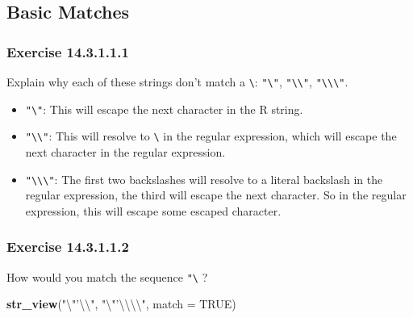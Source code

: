 \documentclass[]{book}
\newenvironment{Shaded}{\begin{snugshade}}{\end{snugshade}}
\newcommand{\CharTok}[1]{\textcolor[rgb]{0.31,0.60,0.02}{#1}}
\newcommand{\DataTypeTok}[1]{\textcolor[rgb]{0.13,0.29,0.53}{#1}}
\newcommand{\KeywordTok}[1]{\textcolor[rgb]{0.13,0.29,0.53}{\textbf{#1}}}
\newcommand{\NormalTok}[1]{#1}
\newcommand{\OtherTok}[1]{\textcolor[rgb]{0.56,0.35,0.01}{#1}}
\newcommand{\StringTok}[1]{\textcolor[rgb]{0.31,0.60,0.02}{#1}}
\providecommand{\tightlist}{%
  \setlength{\itemsep}{0pt}\setlength{\parskip}{0pt}}
\theoremstyle{plain}
\theoremstyle{remark}
\begin{document}
\hypertarget{basic-matches}{%
\subsection{Basic Matches}\label{basic-matches}}

\hypertarget{exercise-14.3.1.1.1}{%
\subsubsection*{\texorpdfstring{Exercise
{14.3.1.1.1}}{Exercise 14.3.1.1.1}}\label{exercise-14.3.1.1.1}}

Explain why each of these strings don't match a
\texttt{\textbackslash{}}: \texttt{"\textbackslash{}"},
\texttt{"\textbackslash{}\textbackslash{}"},
\texttt{"\textbackslash{}\textbackslash{}\textbackslash{}"}.

\begin{itemize}
\tightlist
\item
  \texttt{"\textbackslash{}"}: This will escape the next character in
  the R string.
\item
  \texttt{"\textbackslash{}\textbackslash{}"}: This will resolve to
  \texttt{\textbackslash{}} in the regular expression, which will escape
  the next character in the regular expression.
\item
  \texttt{"\textbackslash{}\textbackslash{}\textbackslash{}"}: The first
  two backslashes will resolve to a literal backslash in the regular
  expression, the third will escape the next character. So in the
  regular expression, this will escape some escaped character.
\end{itemize}

\hypertarget{exercise-14.3.1.1.2}{%
\subsubsection*{\texorpdfstring{Exercise
{14.3.1.1.2}}{Exercise 14.3.1.1.2}}\label{exercise-14.3.1.1.2}}

How would you match the sequence
\texttt{"\textquotesingle{}\textbackslash{}} ?

\begin{Shaded}
\begin{Highlighting}[]
\KeywordTok{str_view}\NormalTok{(}\StringTok{"}\CharTok{\textbackslash{}"}\StringTok{'}\CharTok{\textbackslash{}\textbackslash{}}\StringTok{"}\NormalTok{, }\StringTok{"}\CharTok{\textbackslash{}"}\StringTok{'}\CharTok{\textbackslash{}\textbackslash{}\textbackslash{}\textbackslash{}}\StringTok{"}\NormalTok{, }\DataTypeTok{match =} \OtherTok{TRUE}\NormalTok{)}
\end{Highlighting}
\end{Shaded}
\end{document}
